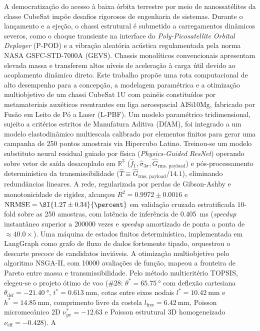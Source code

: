 
\begin{center}
\ABNTEXchapterfont\bfseries\Large\imprimirtitulo
\end{center}

\begin{resumo}
A democratização do acesso à baixa órbita terrestre por meio de nanossatélites da classe CubeSat impõe desafios rigorosos de engenharia de sistemas. Durante o lançamento e a ejeção, o chassi estrutural é submetido a carregamentos dinâmicos severos, como o choque transiente na interface do \textit{Poly-Picosatellite Orbital Deployer} (P-POD) e a vibração aleatória acústica regulamentada pela norma NASA GSFC-STD-7000A (GEVS). Chassis monolíticos convencionais apresentam elevada massa e transferem altos níveis de aceleração à carga útil devido ao acoplamento dinâmico direto. Este trabalho propõe uma rota computacional de alto desempenho para a concepção, a modelagem paramétrica e a otimização multiobjetivo de um chassi CubeSat 1U com painéis constituídos por metamateriais auxéticos reentrantes em liga aeroespacial AlSi10Mg, fabricado por Fusão em Leito de Pó a Laser (L-PBF). Um modelo paramétrico tridimensional, sujeito a critérios estritos de Manufatura Aditiva (DfAM), foi integrado a um modelo elastodinâmico multiescala calibrado por elementos finitos para gerar uma campanha de 250 pontos amostrais via Hipercubo Latino. Treinou-se um modelo substituto neural residual guiado por física (\textit{Physics-Guided ResNet}) operando sobre vetor de saída desacoplado em $\mathbb{R}^3$ ($\hat{f}_1, \hat{\sigma}_{3\sigma}, \hat{G}_{\text{rms, payload}}$) e pós-processamento determinístico da transmissibilidade ($\hat{T} \equiv \hat{G}_{\text{rms, payload}} / \num{14.1}$), eliminando redundâncias lineares. A rede, regularizada por perdas de Gibson-Ashby e monotonicidade de rigidez, alcançou $\overline{R^2} = \num{0.9972} \pm \num{0.0016}$ e $\text{NRMSE} = \SI{1.27 \pm 0.34}{\percent}$ em validação cruzada estratificada $10$-fold sobre as 250 amostras, com latência de inferência de \SI{0.405}{\milli\second} (\textit{speedup} instantâneo superior a \num{200000} vezes e \textit{speedup} amortizado de ponta a ponta de $\approx \num{40.0}\times$). Uma máquina de estados finitos determinística, implementada em LangGraph como grafo de fluxo de dados fortemente tipado, orquestrou o descarte precoce de candidatos inviáveis. A otimização multiobjetivo pelo algoritmo NSGA-II, com \num{10000} avaliações de função, mapeou a fronteira de Pareto entre massa e transmissibilidade. Pelo método multicritério TOPSIS, elegeu-se o projeto ótimo de voo (\#28: $\theta^* = \SI{65.75}{\degree}$ com deflexão cartesiana $\theta_{\text{def}} = \SI{-21.40}{\degree}$, $t^* = \SI{0.613}{\milli\metre}$, cotas entre eixos nodais $l^* = \SI{10.42}{\milli\metre}$ e $h^* = \SI{14.85}{\milli\metre}$, comprimento livre da costela $l_{\text{free}} = \SI{6.42}{\milli\metre}$, Poisson micromecânico 2D $\nu_{yx}^* = \num{-12.63}$ e Poisson estrutural 3D homogeneizado $\nu_{\text{eff}} = \num{-0.428}$). A 
\end{resumo}
